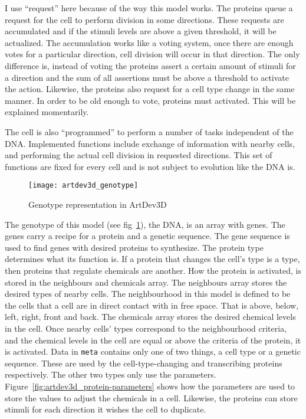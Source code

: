 I use ``request'' here because of the way this model works. The proteins queue a request for the cell to perform division in some directions. These requests are accumulated and if the stimuli levels are above a given threshold, it will be actualized. The accumulation works like a voting system, once there are enough votes for a particular direction, cell division will occur in that direction. The only difference is, instead of voting the proteins assert a certain amount of stimuli for a direction and the sum of all assertions must be above a threshold to activate the action. Likewise, the proteins also request for a cell type change in the same manner. In order to be old enough to vote, proteins must activated. This will be explained momentarily.

The cell is also ``programmed'' to perform a number of tasks independent of the DNA. Implemented functions include exchange of information with nearby cells, and performing the actual cell division in requested directions. This set of functions are fixed for every cell and is not subject to evolution like the DNA is.

\begin{figure}[!ht]
	\centering
	\texttt{[image: artdev3d\_genotype]}
	\caption{Genotype representation in ArtDev3D}
	\label{fig:artdev3d_genotype}
\end{figure}

The genotype of this model (see fig~\ref{fig:artdev3d_genotype}), the DNA, is an array with genes. The genes carry a recipe for a protein and a genetic sequence. The gene sequence is used to find genes with desired proteins to synthesize. The protein type determines what its function is. If a protein that changes the cell's type is a type, then proteins that regulate chemicals are another. How the protein is activated, is stored in the neighbours and chemicals array. The neighbours array stores the desired types of nearby cells. The neighbourhood in this model is defined to be the cells that a cell are in direct contact with in free space. That is above, below, left, right, front and back. The chemicals array stores the desired chemical levels in the cell. Once nearby cells' types correspond to the neighbourhood criteria, and the chemical levels in the cell are equal or above the criteria of the protein, it is activated. Data in \texttt{meta} contains only one of two things, a cell type or a genetic sequence. These are used by the cell-type-changing and transcribing proteins respectively. The other two types only use the parameters. Figure~\ref{fig:artdev3d_protein-parameters} shows how the parameters are used to store the values to adjust the chemicals in a cell. Likewise, the proteins can store stimuli for each direction it wishes the cell to duplicate.

